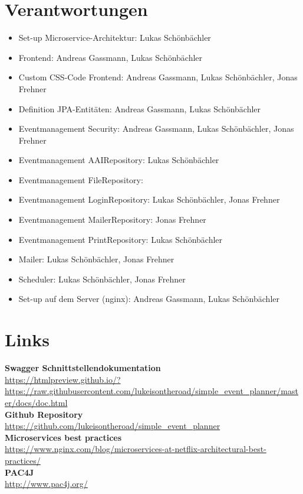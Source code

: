 \documentclass[11pt]{article} %
\begin{document}
\newpage
\begin{appendices}
\section{Verantwortungen}
\begin{itemize}
\item Set-up Microservice-Architektur: Lukas Schönbächler
\item Frontend: Andreas Gassmann, Lukas Schönbächler
\item Custom CSS-Code Frontend: Andreas Gassmann, Lukas Schönbächler, Jonas Frehner
\item Definition JPA-Entitäten: Andreas Gassmann, Lukas Schönbächler
\item Eventmanagement Security: Andreas Gassmann, Lukas Schönbächler, Jonas Frehner
\item Eventmanagement AAIRepository: Lukas Schönbächler
\item Eventmanagement FileRepository:
\item Eventmanagement LoginRepository: Lukas Schönbächler, Jonas Frehner
\item Eventmanagement MailerRepository: Jonas Frehner
\item Eventmanagement PrintRepository: Lukas Schönbächler
\item Mailer: Lukas Schönbächler, Jonas Frehner
\item Scheduler: Lukas Schönbächler, Jonas Frehner
\item Set-up auf dem Server (nginx): Andreas Gassmann, Lukas Schönbächler
\end{itemize}

\section{Links}
\textbf{Swagger Schnittstellendokumentation}\\
\url{https://htmlpreview.github.io/?https://raw.githubusercontent.com/lukeisontheroad/simple_event_planner/master/docs/doc.html}\\

\textbf{Github Repository}\\
\url{https://github.com/lukeisontheroad/simple_event_planner}\\

\textbf{Microservices best practices}\\
\url{https://www.nginx.com/blog/microservices-at-netflix-architectural-best-practices/}\\

\textbf{PAC4J}\\
\url{http://www.pac4j.org/}\\



\newpage

\end{appendices}
\end{document}
